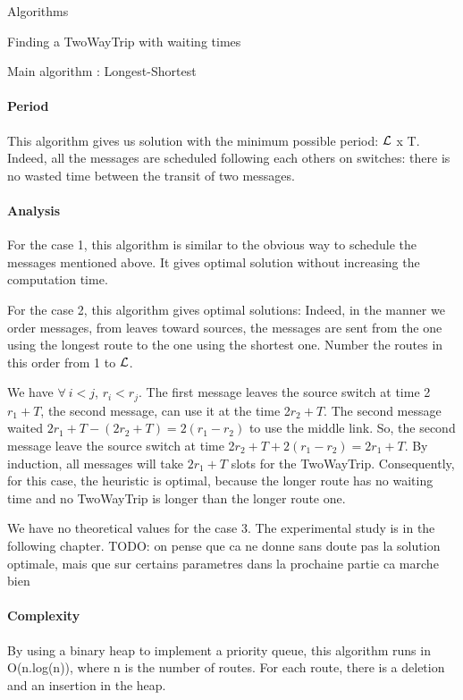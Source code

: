 \documentclass[a4paper,10pt]{report}
\newcommand{\todo}[1]{}
\renewcommand{\todo}[1]{{\color{red} TODO: {#1}}}
\begin{document}
\begin{chapter}{Algorithms}
\begin{section}{Finding a TwoWayTrip with waiting times}
\begin{subsection}{Main algorithm : Longest-Shortest}
\begin{algorithm}[H]
\begin{algorithmic}
\ENDWHILE

\end{algorithmic}
\end{algorithm}


\paragraph{Period}
This algorithm gives us solution with the minimum possible period: ${\cal L}$ x T. Indeed, all the messages are scheduled following each others on switches:
there is no wasted time between the transit of two messages.

\paragraph{Analysis}
For the case 1, this algorithm is similar to the obvious way to schedule the messages mentioned above. It gives optimal solution without increasing 
the computation time.

For the case 2, this algorithm gives optimal solutions: Indeed, in the manner we order messages, from leaves toward sources,
the messages are sent from the one using the longest route to the one using the shortest one. Number the routes in this order from 1 to ${\cal L}$.

We have $\forall \ i<j$, $r_i<r_j$.
The first message leaves the source switch at time 2$r_1+T$, the second message, can use it at the time 2$r_2+T$.
The second message waited $2r_1+T-(2r_2+T) = 2(r_1-r_2)$ to use the middle link. So, the second message leave the source switch at time
2$r_2+T + 2(r_1-r_2) = 2r_1 +T$.
By induction, all messages will take $2r_1 +T$ slots for the TwoWayTrip.
Consequently, for this case, the heuristic is optimal, because the longer route has no waiting time and no TwoWayTrip is longer than the longer route one.

We have no theoretical values for the case 3. The experimental study is in the following chapter.
\todo{on pense que ca ne donne sans doute pas la solution optimale, mais que sur certains parametres dans la prochaine partie ca marche bien}

\paragraph{Complexity}
By using a binary heap to implement a priority queue, this algorithm runs in O(n.log(n)), 
where n is the number of routes. For each route, there is a deletion and an insertion in the heap.
\end{subsection}


\end{section}
\end{chapter}
\end{document}
